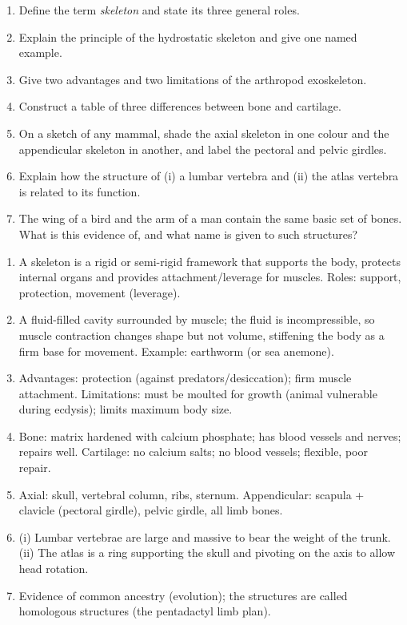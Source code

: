 \documentclass[11pt]{article}
\begin{document}
\begin{exercice}
\begin{enumerate}
\item Define the term \emph{skeleton} and state its three general roles.
\item Explain the principle of the hydrostatic skeleton and give one named example.
\item Give two advantages and two limitations of the arthropod exoskeleton.
\item Construct a table of three differences between bone and cartilage.
\item On a sketch of any mammal, shade the axial skeleton in one colour and the appendicular skeleton in another, and label the pectoral and pelvic girdles.
\item Explain how the structure of (i) a lumbar vertebra and (ii) the atlas vertebra is related to its function.
\item The wing of a bird and the arm of a man contain the same basic set of bones. What is this evidence of, and what name is given to such structures?
\end{enumerate}
\end{exercice}

\begin{corrige}[Exercise 1]
\begin{enumerate}
\item A skeleton is a rigid or semi-rigid framework that supports the body, protects internal organs and provides attachment/leverage for muscles. Roles: support, protection, movement (leverage).
\item A fluid-filled cavity surrounded by muscle; the fluid is incompressible, so muscle contraction changes shape but not volume, stiffening the body as a firm base for movement. Example: earthworm (or sea anemone).
\item Advantages: protection (against predators/desiccation); firm muscle attachment. Limitations: must be moulted for growth (animal vulnerable during ecdysis); limits maximum body size.
\item Bone: matrix hardened with calcium phosphate; has blood vessels and nerves; repairs well. Cartilage: no calcium salts; no blood vessels; flexible, poor repair.
\item Axial: skull, vertebral column, ribs, sternum. Appendicular: scapula + clavicle (pectoral girdle), pelvic girdle, all limb bones.
\item (i) Lumbar vertebrae are large and massive to bear the weight of the trunk. (ii) The atlas is a ring supporting the skull and pivoting on the axis to allow head rotation.
\item Evidence of common ancestry (evolution); the structures are called homologous structures (the pentadactyl limb plan).
\end{enumerate}
\end{corrige}
\end{document}
